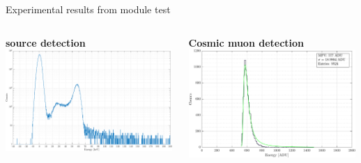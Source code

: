 \documentclass[aspectratio=169,xcolor=dvipsnames,handout]{beamer} %
\begin{document}
\begin{frame}{Experimental results from module test}
\begin{columns}
            \fontsize{7pt}{1}\selectfont
            \centering
            \textbf{ source detection} \\
            \vspace{0.1cm}
            \includegraphics[width=0.99\textwidth]{images/muon_detection/ch4_americio_log.pdf}
            
            \vskip0.15cm
            \textbf{Cosmic muon detection} \\
            \vspace{0.1cm}
            \includegraphics[width=0.99\textwidth]{images/muon_detection/incoming_energy_thr130_ZS_landau.pdf}
    \end{columns}
\end{frame}
\end{document}
